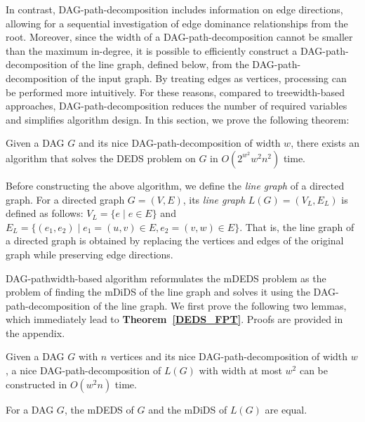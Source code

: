 \documentclass[runningheads]{llncs}
\theoremstyle{plain}
\theoremstyle{definition}
\begin{document}
In contrast, DAG-path-decomposition includes information on edge directions, allowing for a sequential investigation of edge dominance relationships from the root.  
Moreover, since the width of a DAG-path-decomposition cannot be smaller than the maximum in-degree, it is possible to efficiently construct a DAG-path-decomposition of the line graph, defined below, from the DAG-path-decomposition of the input graph.  
By treating edges as vertices, processing can be performed more intuitively.  
For these reasons, compared to treewidth-based approaches, DAG-path-decomposition reduces the number of required variables and simplifies algorithm design.  
In this section, we prove the following theorem:  

\begin{theorem}\label{DEDS_FPT}
    Given a DAG \(G\) and its nice DAG-path-decomposition of width \(w\), there exists an algorithm that solves the DEDS problem on \(G\) in \(O(2^{w^2} w^2 n^2)\) time.  
\end{theorem}

Before constructing the above algorithm, we define the \emph{line graph} of a directed graph.  
For a directed graph \(G = (V, E)\), its \emph{line graph} \(L(G) = (V_L, E_L)\) is defined as follows:  
\(V_L = \{e \mid e \in E\}\) and \(E_L = \{(e_1, e_2) \mid e_1 = (u, v) \in E, e_2 = (v, w) \in E\}\).  
That is, the line graph of a directed graph is obtained by replacing the vertices and edges of the original graph while preserving edge directions.  

DAG-pathwidth-based algorithm reformulates the mDEDS problem as the problem of finding the mDiDS of the line graph and solves it using the DAG-path-decomposition of the line graph.  
We first prove the following two lemmas, which immediately lead to \textbf{Theorem~\ref{DEDS_FPT}}.  
Proofs are provided in the appendix.  

\begin{lemma}\label{DAG_path_decomposition(L(G))}
    Given a DAG \(G\) with \(n\) vertices and its nice DAG-path-decomposition of width \(w\), a nice DAG-path-decomposition of \(L(G)\) with width at most \(w^2\) can be constructed in \(O(w^2 n)\) time.  
\end{lemma}

\begin{lemma}\label{mDEDS_mDiDS}
    For a DAG \(G\), the mDEDS of \(G\) and the mDiDS of \(L(G)\) are equal.  
\end{lemma}
\end{document}
